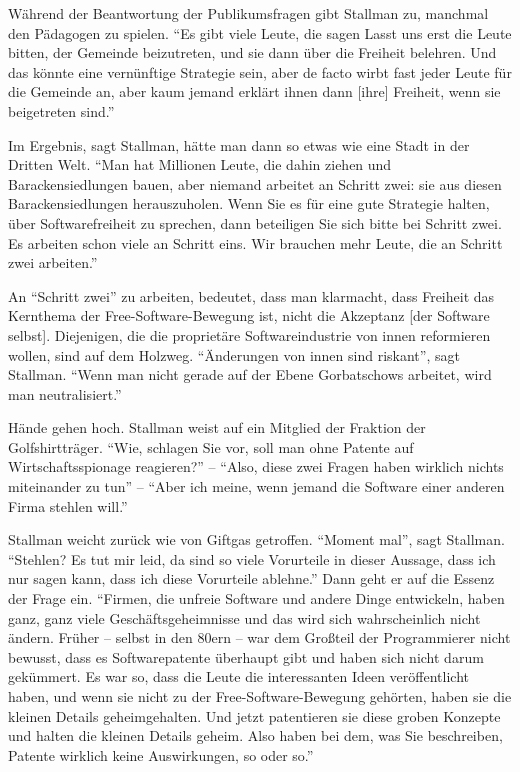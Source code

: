Während der Beantwortung der Publikumsfragen gibt Stallman zu, manchmal den Pädagogen zu spielen. "`Es gibt viele Leute, die sagen \glq Lasst uns erst die Leute bitten, der Gemeinde beizutreten, und sie dann über die Freiheit belehren.\grq{} Und das könnte eine vernünftige Strategie sein, aber de facto wirbt fast jeder Leute für die Gemeinde an, aber kaum jemand erklärt ihnen dann [ihre] Freiheit, wenn sie beigetreten sind."'

Im Ergebnis, sagt Stallman, hätte man dann so etwas wie eine Stadt in der Dritten Welt. "`Man hat Millionen Leute, die dahin ziehen und Barackensiedlungen bauen, aber niemand arbeitet an Schritt zwei: sie aus diesen Barackensiedlungen herauszuholen. Wenn Sie es für eine gute Strategie halten, über Softwarefreiheit zu sprechen, dann beteiligen Sie sich bitte bei Schritt zwei. Es arbeiten schon viele an Schritt eins. Wir brauchen mehr Leute, die an Schritt zwei arbeiten."'

An "`Schritt zwei"' zu arbeiten, bedeutet, dass man klarmacht, dass Freiheit das Kernthema der Free-Software-Bewegung ist, nicht die Akzeptanz [der Software selbst]. Diejenigen, die die proprietäre Softwareindustrie von innen reformieren wollen, sind auf dem Holzweg. "`Änderungen von innen sind riskant"', sagt Stallman. "`Wenn man nicht gerade auf der Ebene Gorbatschows arbeitet, wird man neutralisiert."'

Hände gehen hoch. Stallman weist auf ein Mitglied der Fraktion der Golfshirtträger. "`Wie, schlagen Sie vor, soll man ohne Patente auf Wirtschaftsspionage reagieren?"' – "`Also, diese zwei Fragen haben wirklich nichts miteinander zu tun"' – "`Aber ich meine, wenn jemand die Software einer anderen Firma stehlen will."'

Stallman weicht zurück wie von Giftgas getroffen. "`Moment mal"', sagt Stallman. "`Stehlen? Es tut mir leid, da sind so viele Vorurteile in dieser Aussage, dass ich nur sagen kann, dass ich diese Vorurteile ablehne."' Dann geht er auf die Essenz der Frage ein. "`Firmen, die unfreie Software und andere Dinge entwickeln, haben ganz, ganz viele Geschäftsgeheimnisse und das wird sich wahrscheinlich nicht ändern. Früher – selbst in den 80ern – war dem Großteil der Programmierer nicht bewusst, dass es Softwarepatente überhaupt gibt und haben sich nicht darum gekümmert. Es war so, dass die Leute die interessanten Ideen veröffentlicht haben, und wenn sie nicht zu der Free-Software-Bewegung gehörten, haben sie die kleinen Details geheimgehalten. Und jetzt patentieren sie diese groben Konzepte und halten die kleinen Details geheim. Also haben bei dem, was Sie beschreiben, Patente wirklich keine Auswirkungen, so oder so."'


